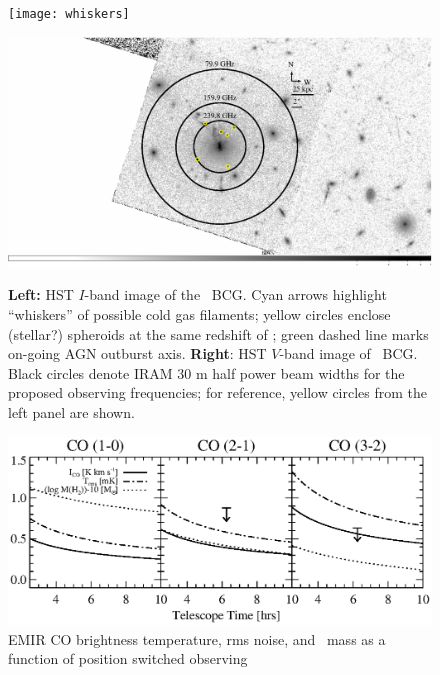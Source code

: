 \documentclass[11pt]{article}
\begin{document}
\begin{figure}[htp]
  \begin{center}
    \begin{minipage}{0.495\linewidth}    
      \texttt{[image: whiskers]}
    \end{minipage}
    \begin{minipage}{0.495\linewidth}
      \includegraphics*[width=\textwidth, trim=59mm 18mm 52mm 10mm, clip]{beam}
    \end{minipage}
    \caption{{\bf{Left:}} HST $I$-band image of the \irs\ BCG. Cyan
      arrows highlight ``whiskers'' of possible cold gas filaments;
      yellow circles enclose (stellar?) spheroids at the same redshift
      of \irs; green dashed line marks on-going AGN outburst
      axis. {\bf{Right}}: HST $V$-band image of \irs\ BCG. Black
      circles denote IRAM 30 m half power beam widths for the proposed
      observing frequencies; for reference, yellow circles from the
      left panel are shown.}
    \label{fig:i09}
    \begin{minipage}{\linewidth}
      \includegraphics*[width=\textwidth, trim=28mm 10mm 9mm 50mm, clip]{iram_mh2.eps}
    \end{minipage}
    \caption{EMIR CO brightness temperature, rms noise, and
      \htoo\ mass as a function of position switched observing
}
\end{center}
\end{figure}
\end{document}
